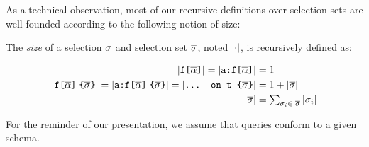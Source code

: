 As a technical observation, most of our recursive definitions over
selection sets are well-founded according to the following notion of
size:
\begin{definition}[\cite{gqlph}]
The \emph{size} of a selection $\sel$ and selection set $\sset$, noted $\ssize{\cdot}$, is recursively defined as:
\begin{small}
\begin{align*}
    \ssize{\fld}  = \ssize{\afld} &=  1\\
    \ssize{\nfld{\sset}} = \ssize{\anfld{\sset}} = \ssize{\ifrag{t}{\sset}} &= 1 + \ssize{\sset}\\
    \ssize{\sset} &= \textstyle\sum_{\sel_{i} \in\; \sset}{\ssize{\sel_{i}}}
    \end{align*}
\end{small}
\end{definition} 

For the reminder of our presentation, we assume that queries conform to a given schema.






